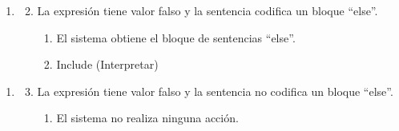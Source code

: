 \begin{framed}
\begin{description}
\begin{enumerate}
   \renewcommand{\labelenumii}{\arabic{enumi}\alph{enumii}.}
      \item 
      \begin {enumerate}
         \setcounter{enumii}{1}
         \item La expresión tiene valor falso y la sentencia codifica un bloque ``else''.
         \begin{enumerate}
         \item El sistema obtiene el bloque de sentencias ``else''.
         \item Include (Interpretar) 
         \end{enumerate}
      \end{enumerate}
   \end{enumerate}
   \begin{enumerate} \itemsep1pt \parskip0pt 
   \setcounter{enumi}{2}
   \renewcommand{\labelenumi}{}
   \renewcommand{\labelenumiii}{\arabic{enumiii}.}
   \renewcommand{\labelenumii}{\arabic{enumi}\alph{enumii}.}
      \item 
      \begin {enumerate}
         \setcounter{enumii}{2}
         \item La expresión tiene valor falso y la sentencia no codifica un bloque ``else''.
         \begin{enumerate}
         \item El sistema no realiza ninguna acción. 
         \end{enumerate}
      \end{enumerate}
   \end{enumerate}
\end{description}
 \FloatBarrier
\end{framed}
